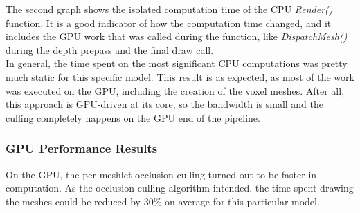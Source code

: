 \noindent
The second graph shows the isolated computation time of the \ac{CPU} \emph{Render()} function. It is a good indicator of 
how the computation time changed, and it includes the \ac{GPU} work that was called during the function, like 
\emph{DispatchMesh()} during the depth prepass and the final draw call. \\

\noindent
In general, the time spent on the most significant \ac{CPU} computations was pretty much static for this specific 
model. This result is as expected, as most of the work was executed on the \ac{GPU}, including the creation of the 
voxel meshes. After all, this approach is \ac{GPU}-driven at its core, so the bandwidth is small and the culling 
completely happens on the \ac{GPU} end of the pipeline.

\subsubsection*{GPU Performance Results} \label{subsubsec-gpu-performance-results-lucy}


On the \ac{GPU}, the per-meshlet occlusion culling turned out to be faster in computation. As the occlusion 
culling algorithm intended, the time spent drawing the meshes could be reduced by $30\%$ on average for this 
particular model.

